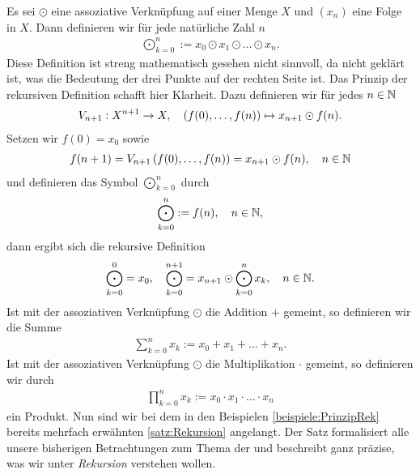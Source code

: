 {
Es sei $\odot$ eine assoziative Verknüpfung auf einer Menge $X$ und $(x_n)$ eine Folge in $X$. Dann definieren wir für jede natürliche Zahl $n$
\begin{align*}
    \bigodot_{k=0}^{n} := x_0\odot x_1\odot \ldots \odot x_n.
\end{align*}
Diese Definition ist streng mathematisch gesehen nicht sinnvoll, da nicht geklärt ist, was die Bedeutung der drei Punkte auf der rechten Seite ist. Das Prinzip der rekursiven Definition schafft hier Klarheit. Dazu definieren wir für jedes $n\in\mathbb{N}$
\begin{align*}
    V_{n+1}: X^{n+1}\to X, \quad \left(f(0),\ldots,f(n)\right) \mapsto x_{n+1}\odot f(n).
\end{align*}
Setzen wir $f(0) = x_0$ sowie
\begin{align*}
    f(n+1) = V_{n+1}\left(f(0),\ldots, f(n)\right) = x_{n+1}\odot f(n), \quad n\in\mathbb{N}
\end{align*}
und definieren das Symbol $\bigodot_{k=0}^{n}$ durch
\begin{align*}
    \bigodot_{k=0}^{n} := f(n), \quad n\in\mathbb{N},
\end{align*}
dann ergibt sich die rekursive Definition
\begin{align*}
    \bigodot_{k=0}^0 = x_0, \quad \bigodot_{k=0}^{n+1} = x_{n+1}\odot \bigodot_{k=0}^{n}x_k, \quad n\in\mathbb{N}.
\end{align*}
Ist mit der assoziativen Verknüpfung $\odot$ die Addition $+$ gemeint, so definieren wir die Summe
\begin{align}\label{eq:summe}
    \sum_{k=0}^n x_k := x_0 + x_1 + \ldots + x_n.
\end{align}
Ist mit der assoziativen Verknüpfung $\odot$ die Multiplikation $\cdot$ gemeint, so definieren wir durch
\begin{align*}
    \prod_{k=0}^n x_k := x_0 \cdot x_1 \cdot \ldots \cdot x_n
\end{align*}
ein Produkt.
}
\noindent
Nun sind wir bei dem in den Beispielen \ref{beispiele:PrinzipRek} bereits mehrfach erwähnten \cref{satz:Rekursion} angelangt. Der Satz formalisiert alle unsere bisherigen Betrachtungen zum Thema der  und beschreibt ganz präzise, was wir unter \textit{Rekursion} verstehen wollen.


